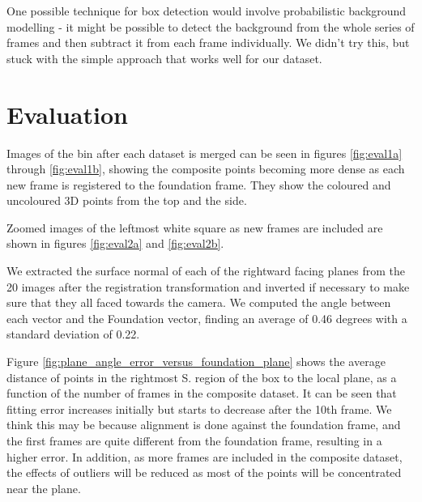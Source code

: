 \documentclass[12pt,a4paper,onecolumn]{article}
\begin{document}
One possible technique for box detection
would involve probabilistic background modelling - it might be possible
to detect the background from the whole series of frames
and then subtract it from each frame individually. 
We didn't try this, but stuck with the
simple approach that works well for our dataset.

\section{Evaluation}

Images of the bin after each dataset is merged can be seen in figures \ref{fig:eval1a} through \ref{fig:eval1b}, showing the composite points becoming more dense as each new frame is registered to the foundation frame.  They show the coloured and uncoloured 3D points from the top and the side.

Zoomed images of the leftmost white square as new frames are included are shown in figures \ref{fig:eval2a} and \ref{fig:eval2b}.

We extracted the surface normal of each of the rightward facing planes from the 20 images after the registration transformation and inverted if necessary to make sure that they all faced towards the camera.  We computed the angle between each vector and the Foundation vector, finding an average of 0.46 degrees with a standard deviation of 0.22.

Figure \ref{fig:plane_angle_error_versus_foundation_plane} shows the average distance of points in the rightmost S. region of the box to the local plane, as a function of the number of frames in the composite dataset.  It
can be seen that fitting error increases initially but starts to decrease
after the 10th frame. We think this may be because
 alignment is done against the foundation frame, and
the first frames are quite different from the foundation frame,
resulting in a higher error.  In addition, as more frames are included in the composite dataset, the effects of outliers will be reduced as most of the points will be concentrated near the plane.
\end{document}
